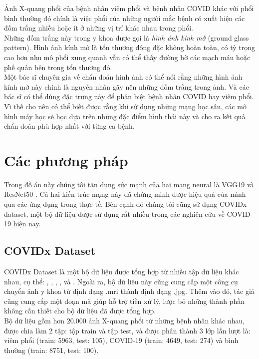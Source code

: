 \documentclass{article}
\begin{document}
Ảnh X-quang phổi của bệnh nhân viêm phổi và bệnh nhân COVID khác với phổi bình thường đó chính là việc phổi của những người mắc bệnh có xuất hiện các đốm trắng nhiều hoặc ít ở những vị trí khác nhau trong phổi. \\

Những đốm trắng này trong y khoa được gọi là \textit{hình ảnh kính mờ} (ground glass pattern). Hình ảnh kính mờ là tổn thương đông đặc không hoàn toàn, có tỷ trọng cao hơn nhu mô phổi xung quanh vẫn có thể thấy đường bờ các mạch máu hoặc phế quản bên trong tổn thương đó.\\

Một bác sĩ chuyên gia về chẩn đoán hình ảnh có thể nói rằng những hình ảnh kính mờ này chính là nguyên nhân gây nên những đốm trắng trong ảnh. Và các bác sĩ có thể dùng đặc trưng này để phân biệt bệnh nhân COVID hay viêm phổi. Vì thế cho nên có thể biết được rằng khi sử dụng những mạng học sâu, các mô hình máy học sẽ học dựa trên những đặc điểm hình thái này và cho ra kết quả chẩn đoán phù hợp nhất với từng ca bệnh. 

\section{Các phương pháp}
Trong đồ án này chúng tôi tận dụng sức mạnh của hai mạng neural là VGG19 \cite{vgg19} và ResNet50 \cite{resnet50}. Cả hai kiến trúc mạng này đã chứng minh được hiệu quả của mình qua các ứng dụng trong thực tế. Bên cạnh đó chúng tôi cũng sử dụng COVIDx dataset, một bộ dữ liệu được sử dụng rất nhiều trong các nghiên cứu về COVID-19 hiện nay.

\subsection{COVIDx Dataset}
COVIDx Dataset \cite{covidxdataset} là một bộ dữ liệu được tổng hợp từ nhiều tập dữ liệu khác nhau, cụ thể: \citet{data1}, \citet{data2}, \citet{data3}, \citet{data4}, và \citet{data5}. Ngoài ra, bộ dữ liệu này cũng cung cấp một công cụ chuyển ảnh y khoa từ định dạng .mri thành định dạng .jpg. Thêm vào đó, tác giả cũng cung cấp một đoạn mã giúp hỗ trợ tiền xử lý, lược bỏ những thành phần không cần thiết cho bộ dữ liệu đã được tổng hợp.\\

Bộ dữ liệu gồm hơn $20.000$ ảnh X-quang phổi từ những bệnh nhân khác nhau, được chia làm 2 tập: tập train và tập test, và được phân thành 3 lớp lần lượt là: viêm phổi (train: 5963, test: 105), COVID-19 (train: 4649, test: 274) và bình thường (train: 8751, test: 100).\\
\end{document}
